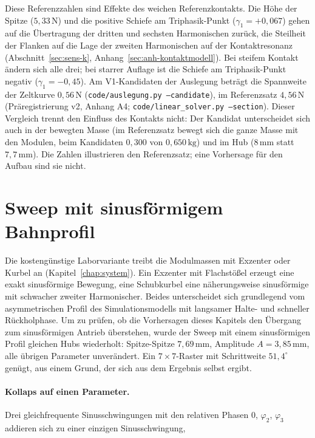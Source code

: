 \documentclass[12pt,a4paper]{report}
\begin{document}
Diese Referenzzahlen sind Effekte des weichen Referenzkontakts. Die Höhe
der Spitze ($5{,}33\,\mathrm{N}$) und die positive Schiefe am
Triphasik-Punkt ($\gamma_1 = +0{,}067$) gehen auf die Übertragung der
dritten und sechsten Harmonischen zurück, die Steilheit der Flanken auf
die Lage der zweiten Harmonischen auf der Kontaktresonanz
(Abschnitt~\ref{sec:sens-k}, Anhang~\ref{sec:anh-kontaktmodell}). Bei
steifem Kontakt ändern sich alle drei; bei starrer Auflage ist die
Schiefe am Triphasik-Punkt negativ ($\gamma_1 = -0{,}45$). Am
V1-Kandidaten der Auslegung beträgt die Spannweite der Zeltkurve
$0{,}56\,\mathrm{N}$ (\texttt{code/auslegung.py --candidate}), im
Referenzsatz $4{,}56\,\mathrm{N}$ (Präregistrierung v2, Anhang A4;
\texttt{code/linear\_solver.py --section}). Dieser Vergleich trennt den
Einfluss des Kontakts nicht: Der Kandidat unterscheidet sich auch in
der bewegten Masse (im Referenzsatz bewegt sich die ganze Masse mit den
Modulen, beim Kandidaten $0{,}300$ von $0{,}650\,\mathrm{kg}$) und im
Hub ($8\,\mathrm{mm}$ statt $7{,}7\,\mathrm{mm}$). Die Zahlen
illustrieren den Referenzsatz; eine Vorhersage für den Aufbau sind sie
nicht.

\section{Sweep mit sinusförmigem Bahnprofil}
\label{sec:sinus-sweep}

Die kostengünstige Laborvariante treibt die Modulmassen mit Exzenter oder
Kurbel an (Kapitel~\ref{chap:system}). Ein Exzenter mit Flachstößel
erzeugt eine exakt sinusförmige Bewegung, eine Schubkurbel eine
näherungsweise sinusförmige mit schwacher zweiter Harmonischer. Beides
unterscheidet sich grundlegend vom asymmetrischen Profil des
Simulationsmodells mit langsamer Halte- und schneller Rückholphase. Um
zu prüfen, ob die Vorhersagen dieses Kapitels den Übergang zum
sinusförmigen Antrieb überstehen, wurde der Sweep mit einem
sinusförmigen Profil gleichen Hubs wiederholt: Spitze-Spitze
$7{,}69\,\mathrm{mm}$, Amplitude $A = 3{,}85\,\mathrm{mm}$, alle übrigen
Parameter unverändert. Ein $7\times7$-Raster mit Schrittweite
$51{,}4^\circ$ genügt, aus einem Grund, der sich aus dem Ergebnis selbst
ergibt.

\paragraph{Kollaps auf einen Parameter.}
Drei gleichfrequente Sinusschwingungen mit den relativen Phasen
$0$, $\varphi_2$, $\varphi_3$ addieren sich zu einer einzigen
Sinusschwingung,
\end{document}
